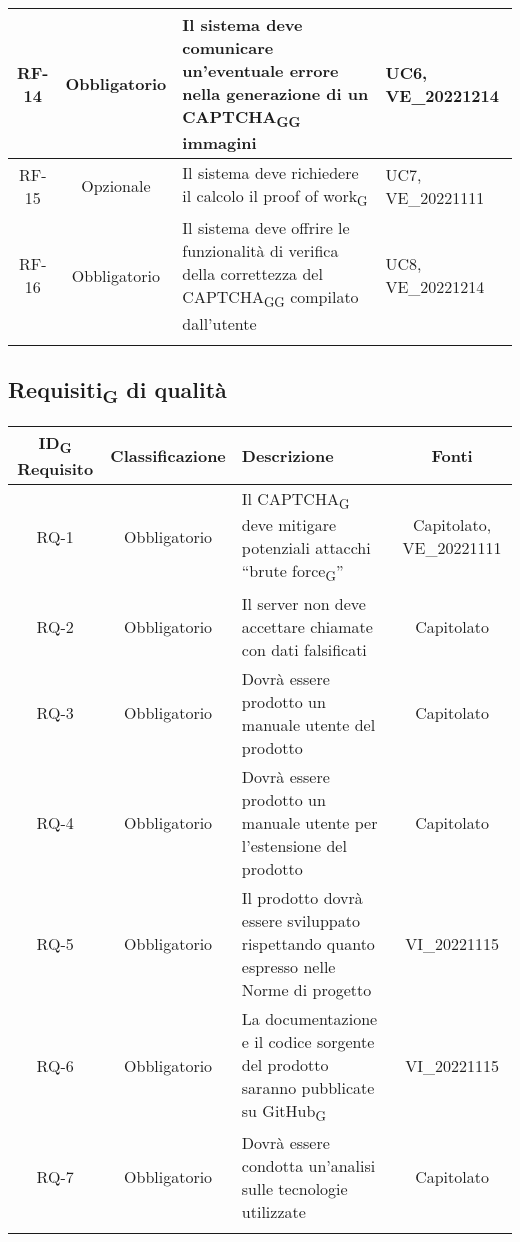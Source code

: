 \begin{tabularx}{\textwidth}{| c | c | X | X |}
 \hline
 RF-14 & Obbligatorio & Il sistema deve comunicare un'eventuale errore nella generazione di un CAPTCHA\textsubscript{G}\textsubscript{G} immagini & UC6, VE\_20221214\\
 \hline
 RF-15 & Opzionale & Il sistema deve richiedere il calcolo il proof of work\textsubscript{G} & UC7, VE\_20221111\\
 \hline
 RF-16 & Obbligatorio & Il sistema deve offrire le funzionalità di verifica della correttezza del CAPTCHA\textsubscript{G}\textsubscript{G} compilato dall'utente & UC8, VE\_20221214\\
 \hline
 \caption{Requisiti\textsubscript{G} funzionali}
\end{tabularx}

\subsection{Requisiti\textsubscript{G} di qualità}
\renewcommand\tabularxcolumn[1]{>{\Centering}m{#1}}
\begin{tabularx}{\textwidth}{| c | c | X | c |} 
 \hline
 \textbf{ID\textsubscript{G} Requisito} & \textbf{Classificazione} & \textbf{Descrizione} & \textbf{Fonti} \\
 \hline
 RQ-1 & Obbligatorio & Il CAPTCHA\textsubscript{G} deve mitigare potenziali attacchi “brute force\textsubscript{G}” & Capitolato, VE\_20221111\\
 \hline
  RQ-2 & Obbligatorio & Il server non deve accettare chiamate con dati falsificati & Capitolato\\
 \hline
 RQ-3 & Obbligatorio & Dovrà essere prodotto un manuale utente del prodotto & Capitolato\\
 \hline
 RQ-4 & Obbligatorio & Dovrà essere prodotto un manuale utente per l'estensione del prodotto &  Capitolato\\
 \hline
 RQ-5 & Obbligatorio & Il prodotto dovrà essere sviluppato rispettando quanto espresso nelle Norme di progetto & VI\_20221115\\
 \hline
 RQ-6 & Obbligatorio & La documentazione e il codice sorgente del prodotto saranno pubblicate su GitHub\textsubscript{G} & VI\_20221115\\
 \hline
 RQ-7 & Obbligatorio & Dovrà essere condotta un'analisi sulle tecnologie utilizzate & Capitolato\\
 \hline
 \caption{Requisiti\textsubscript{G} di qualità}
\end{tabularx}

